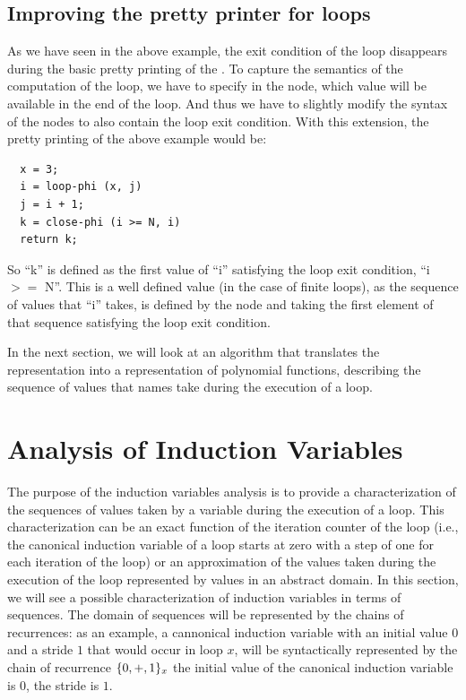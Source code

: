 \subsection{Improving the \SSA{} pretty printer for loops}

As we have seen in the above example, the exit condition of the loop
disappears during the basic pretty printing of the \SSA{}.  To capture
the semantics of the computation of the loop, we have to specify in
the \closephi{} node, which value will be available in the end of the
loop.  And thus we have to slightly modify the syntax of the
\closephi{} nodes to also contain the loop exit condition.  With this
extension, the \SSA{} pretty printing of the above example would be:
\begin{verbatim}
  x = 3;
  i = loop-phi (x, j)
  j = i + 1;
  k = close-phi (i >= N, i)
  return k;
\end{verbatim}
So ``k'' is defined as the first value of ``i'' satisfying the loop
exit condition, ``i $>=$ N''.  This is a well defined value (in the
case of finite loops), as the sequence of values that ``i'' takes, is
defined by the \loopphi{} node and taking the first element of that
sequence satisfying the loop exit condition.

In the next section, we will look at an algorithm that translates the
\SSA{} representation into a representation of polynomial functions,
describing the sequence of values that \SSA{} names take during the
execution of a loop.

\section{Analysis of Induction Variables}

The purpose of the induction variables analysis is to provide a
characterization of the sequences of values taken by a variable during
the execution of a loop.  This characterization can be an exact
function of the iteration counter of the loop (i.e., the canonical
induction variable of a loop starts at zero with a step of one for
each iteration of the loop) or an approximation of the values taken
during the execution of the loop represented by values in an abstract
domain.  In this section, we will see a possible characterization of
induction variables in terms of sequences.  The domain of sequences
will be represented by the chains of recurrences: as an example, a
cannonical induction variable with an initial value $0$ and a stride
$1$ that would occur in loop $x$, will be syntactically represented by
the chain of recurrence $\{0, +, 1\}_x$ the initial value of the
canonical induction variable is $0$, the stride is $1$.

